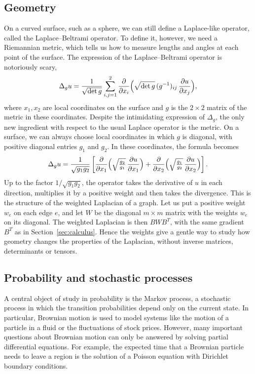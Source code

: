 \documentclass[11pt,a4paper]{article}
\theoremstyle{plain}
\theoremstyle{definition}
\begin{document}
\subsection{Geometry}

On a curved surface, such as a sphere, we can still define a Laplace-like operator, called the Laplace--Beltrami operator. To define it, however, we need a Riemannian metric, which tells us how to measure lengths and angles at each point of the surface. The expression of the Laplace--Beltrami operator \cite{rosenberg1997} is notoriously scary,
\[
\Delta_g u=\frac{1}{\sqrt{\det g}}\sum_{i,j=1}^2\frac{\partial}{\partial x_i}\Bigl(\sqrt{\det g}\,(g^{-1})_{ij}\,\frac{\partial u}{\partial x_j}\Bigr),
\]
where $x_1,x_2$ are local coordinates on the surface and $g$ is the $2\times2$ matrix of the metric in these coordinates. Despite the intimidating expression of $\Delta_g$, the only new ingredient with respect to the usual Laplace operator is the metric. On a surface, we can always choose local coordinates in which $g$ is diagonal, with positive diagonal entries $g_1$ and $g_2$. In these coordinates, the formula becomes
\[
\Delta_g u=\frac{1}{\sqrt{g_1g_2}}\left[\frac{\partial}{\partial x_1}\Bigl(\sqrt{\tfrac{g_2}{g_1}}\,\frac{\partial u}{\partial x_1}\Bigr)+\frac{\partial}{\partial x_2}\Bigl(\sqrt{\tfrac{g_1}{g_2}}\,\frac{\partial u}{\partial x_2}\Bigr)\right].
\]
Up to the factor $1/\sqrt{g_1g_2}$, the operator takes the derivative of $u$ in each direction, multiplies it by a positive weight and then takes the divergence. This is the structure of the weighted Laplacian of a graph. Let us put a positive weight $w_e$ on each edge $e$, and let $W$ be the diagonal $m\times m$ matrix with the weights $w_e$ on its diagonal. The weighted Laplacian is then $BWB^T$, with the same gradient $B^T$ as in Section~\ref{sec:calculus}. Hence the weights give a gentle way to study how geometry changes the properties of the Laplacian, without inverse matrices, determinants or tensors.

\subsection{Probability and stochastic processes}

A central object of study in probability is the Markov process, a stochastic process in which the transition probabilities depend only on the current state. In particular, Brownian motion is used to model systems like the motion of a particle in a fluid or the fluctuations of stock prices. However, many important questions about Brownian motion can only be answered by solving partial differential equations. For example, the expected time that a Brownian particle needs to leave a region is the solution of a Poisson equation with Dirichlet boundary conditions.
\end{document}

